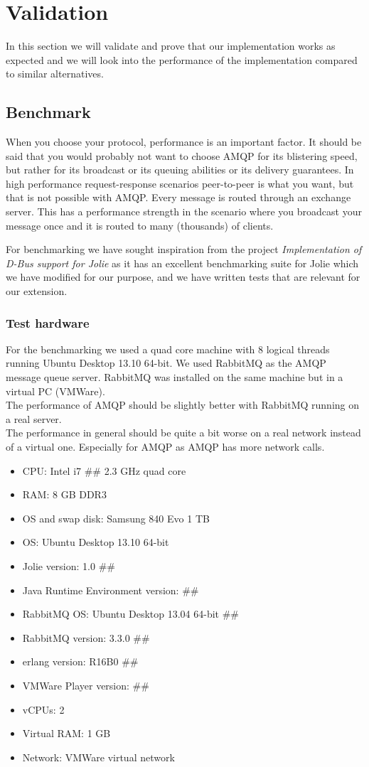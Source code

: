 \section{Validation}
In this section we will validate and prove that our implementation works as expected and we will look into the performance of the implementation compared to similar alternatives.
\subsection{Benchmark}
When you choose your protocol, performance is an important factor. It should be said that you would probably not want to choose AMQP for its blistering speed, but rather for its broadcast or its queuing abilities or its delivery guarantees. In high performance request-response scenarios peer-to-peer is what you want, but that is not possible with AMQP. Every message is routed through an exchange server. This has a performance strength in the scenario where you broadcast your message once and it is routed to many (thousands) of clients.

For benchmarking we have sought inspiration from the project \textit{Implementation of D-Bus support for Jolie}\cite{D-Bus} as it has an excellent benchmarking suite for Jolie which we have modified for our purpose, and we have written tests that are relevant for our extension.
\subsubsection{Test hardware}
For the benchmarking we used a quad core machine with 8 logical threads running Ubuntu Desktop 13.10 64-bit. We used RabbitMQ as the AMQP message queue server. RabbitMQ was installed on the same machine but in a virtual PC (VMWare).\\
The performance of AMQP should be slightly better with RabbitMQ running on a real server.\\
The performance in general should be quite a bit worse on a real network instead of a virtual one. Especially for AMQP as AMQP has more network calls.
\begin{itemize}
\item CPU: Intel i7 \#\# 2.3 GHz quad core
\item RAM: 8 GB DDR3
\item OS and swap disk: Samsung 840 Evo 1 TB
\item OS: Ubuntu Desktop 13.10 64-bit
\item Jolie version: 1.0 \#\#
\item Java Runtime Environment version: \#\#
\item RabbitMQ OS: Ubuntu Desktop 13.04 64-bit \#\#
\item RabbitMQ version: 3.3.0 \#\#
\item erlang version: R16B0 \#\#
\item VMWare Player version: \#\#
\item vCPUs: 2
\item Virtual RAM: 1 GB
\item Network: VMWare virtual network
\end{itemize}
